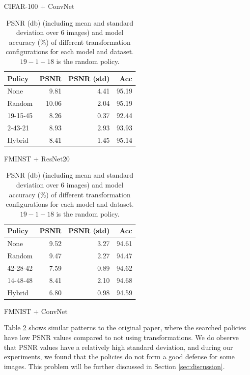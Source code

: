 \begin{center}
\begin{table}[h]
\begin{subtable}[h]{0.25\textwidth}
        \caption{CIFAR-100 + ConvNet}
    \end{subtable}
    \vfill
    \vspace{0mm}
    \begin{subtable}[h]{0.25\textwidth}
        \begin{tabular}{lrrr}
            \hline
             Policy   &   PSNR &   PSNR (std) &   Acc \\
            \hline
             None     &        9.81 &       4.41 & 95.19 \\
             Random   &       10.06 &       2.04 & 95.19 \\
             19-15-45 &        8.26 &       0.37 & 92.44 \\
             2-43-21  &        8.93 &       2.93 & 93.93 \\
             Hybrid   &        8.41 &       1.45 & 95.14 \\
            \hline
        \end{tabular}
        \caption{FMINST + ResNet20}
    \end{subtable}
    \hspace{40mm}%
    \begin{subtable}[h]{0.25\textwidth}
        \begin{tabular}{lrrr}
            \hline
             Policy   &   PSNR &   PSNR (std) &   Acc \\
            \hline
             None     &        9.52 &       3.27 & 94.61 \\
             Random   &        9.47 &       2.27 & 94.47 \\
             42-28-42 &        7.59 &       0.89 & 94.62 \\
             14-48-48 &        8.41 &       2.10 & 94.68 \\
             Hybrid   &        6.80 &       0.98 & 94.59 \\
            \hline
        \end{tabular}
        \caption{FMNIST + ConvNet}
    \end{subtable}
    \caption{PSNR (db) (including mean and standard deviation over $6$ images) and model accuracy (\%) of different transformation configurations for each model and dataset. $19-1-18$ is the random policy.}
    \label{tab:1}
\end{table}
\end{center}
Table \ref{tab:1} shows similar patterns to the original paper, where the searched policies have low PSNR values compared to not using transformations. We do observe that PSNR values have a relatively high standard deviation, and during our experiments, we found that the policies do not form a good defense for some images. This problem will be further discussed in Section \ref{sec:discussion}.

